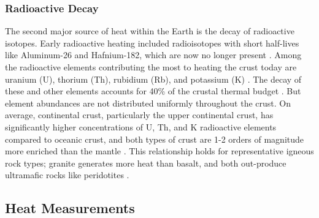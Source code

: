 \subsubsection{Radioactive Decay}
The second major source of heat within the Earth is the decay of radioactive isotopes. Early radioactive heating included radioisotopes with short half-lives like Aluminum-26 and Hafnium-182, which are now no longer present \citep[~p. 16]{glassley_geothermal_2015}. Among the radioactive elements contributing the most to heating the crust today are uranium (U), thorium (Th), rubidium (Rb), and potassium (K) \citep[~p. 17]{glassley_geothermal_2015}. The decay of these and other elements accounts for 40\% of the crustal thermal budget \citep{stein_heat_1995}. But element abundances are not distributed uniformly throughout the crust. On average, continental crust, particularly the upper continental crust, has significantly higher concentrations of U, Th, and K radioactive elements compared to oceanic crust, and both types of crust are 1-2 orders of magnitude more enriched than the mantle \citep[~p. 276]{fowler_solid_2005}. This relationship holds for representative igneous rock types; granite generates more heat than basalt, and both out-produce ultramafic rocks like peridotites \citep[~p. 276]{fowler_solid_2005}.
\subsection{Heat Measurements}
